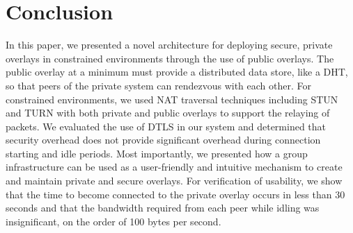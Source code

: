 \documentclass[conference]{IEEEtran}
\begin{document}
%
%
%
\section{Conclusion}
\label{conclusions}
In this paper, we presented a novel architecture for deploying secure, private
overlays in constrained environments through the use of public overlays.
The public overlay at a minimum must provide a distributed data store,
like a DHT, so that peers of the private system can rendezvous with each other.
For constrained environments, we used NAT traversal techniques including STUN and
TURN with both private and public overlays to support the relaying of packets.
We evaluated the use of DTLS in our system and determined that security overhead
does not provide significant overhead during connection starting and idle periods.
Most
importantly, we presented how a group infrastructure can be used as a user-friendly
and intuitive mechanism to create and maintain private and secure overlays.  
For verification of usability, we show that the time to become connected to the
private overlay occurs in less than 30 seconds and that the bandwidth required 
from each peer while idling was insignificant, on the order of 100 bytes per
second.
\end{document}
